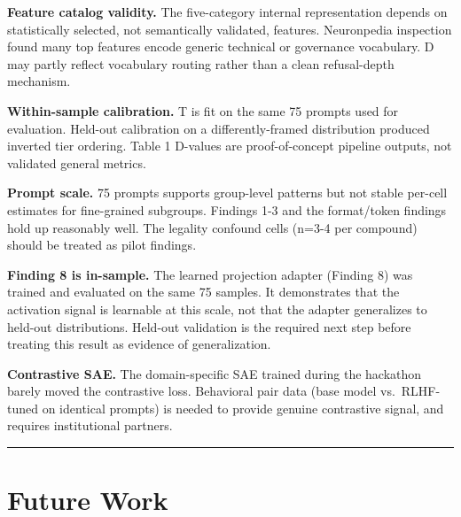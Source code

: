 \documentclass[
  11pt,
]{article}
\begin{document}
\textbf{Feature catalog validity.} The five-category internal
representation depends on statistically selected, not semantically
validated, features. Neuronpedia inspection found many top features
encode generic technical or governance vocabulary. D may partly reflect
vocabulary routing rather than a clean refusal-depth mechanism.

\textbf{Within-sample calibration.} T is fit on the same 75 prompts used
for evaluation. Held-out calibration on a differently-framed
distribution produced inverted tier ordering. Table 1 D-values are
proof-of-concept pipeline outputs, not validated general metrics.

\textbf{Prompt scale.} 75 prompts supports group-level patterns but not
stable per-cell estimates for fine-grained subgroups. Findings 1-3 and
the format/token findings hold up reasonably well. The legality confound
cells (n=3-4 per compound) should be treated as pilot findings.

\textbf{Finding 8 is in-sample.} The learned projection adapter (Finding
8) was trained and evaluated on the same 75 samples. It demonstrates
that the activation signal is learnable at this scale, not that the
adapter generalizes to held-out distributions. Held-out validation is
the required next step before treating this result as evidence of
generalization.

\textbf{Contrastive SAE.} The domain-specific SAE trained during the
hackathon barely moved the contrastive loss. Behavioral pair data (base
model vs.~RLHF-tuned on identical prompts) is needed to provide genuine
contrastive signal, and requires institutional partners.

\begin{center}\rule{0.5\linewidth}{0.5pt}\end{center}

\hypertarget{future-work}{%
\section{Future Work}\label{future-work}}
\end{document}
